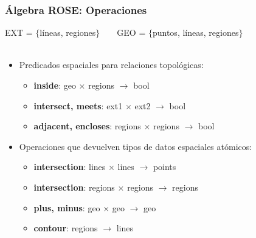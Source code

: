 \documentclass[12pt]{beamer}
\begin{document}
\begin{frame}
\frametitle{\'Algebra ROSE: Operaciones}
EXT = $\lbrace$l\'ineas, regiones$\rbrace$\ \ \ \ GEO = $\lbrace$puntos, l\'ineas, regiones$\rbrace$\\
\ \\
\begin{itemize}
\item Predicados espaciales para relaciones topol\'ogicas:\\
\begin{itemize}
\item \textbf{inside}: geo $\times$ regions $\rightarrow$ bool
\item \textbf{intersect, meets}: ext1 $\times$ ext2 $\rightarrow$ bool
\item \textbf{adjacent, encloses}: regions $\times$ regions $\rightarrow$ bool
\end{itemize}
\item Operaciones que devuelven tipos de datos espaciales at\'omicos:\\
\begin{itemize}
\item \textbf{intersection}: lines $\times$ lines $\rightarrow$ points
\item \textbf{intersection}: regions $\times$ regions $\rightarrow$ regions
\item \textbf{plus, minus}: geo $\times$ geo $\rightarrow$ geo
\item \textbf{contour}: regions $\rightarrow$ lines
\end{itemize}
\end{itemize}
\end{frame}
\end{document}
